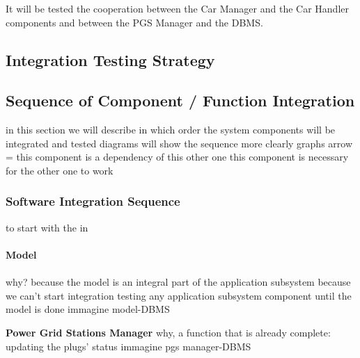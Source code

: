 \documentclass[english]{article}
\begin{document}
It will be tested the cooperation between the Car Manager and the Car Handler components and between the PGS Manager and the DBMS.


\subsection{Integration Testing Strategy}

\subsection{Sequence of Component / Function Integration}

in this section we will describe in which order the system components will be integrated and tested
diagrams will show the sequence more clearly
graphs
arrow = this component is a dependency of this other one
this component is necessary for the other one to work


\subsubsection{Software Integration Sequence}

to start with the in


\paragraph{Model}
\paragraph{}
why?
because the model is an integral part of the application subsystem
because we can’t start integration testing any application subsystem component until the model is done
immagine model-DBMS
\begin{figure}[H]
	\centering
\end{figure}

\textbf{Power Grid Stations Manager}
why,  a function that is already complete: updating the plugs’ status
immagine pgs manager-DBMS
\begin{figure}[H]
	\centering
\end{figure}
\end{document}
